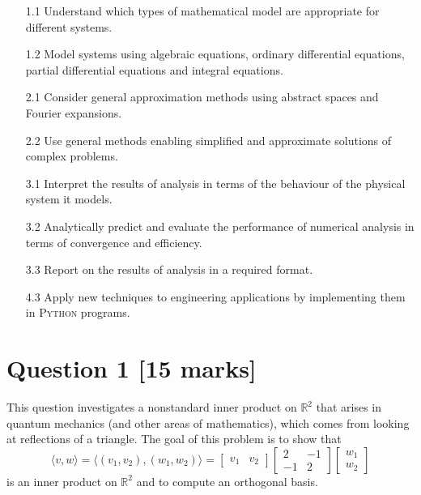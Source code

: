 \documentclass[12pt]{article}
\newcommand{\inp}[2]{\langle #1, #2 \rangle}
\newcommand{\RR}{\mathbb{R}}
\begin{document}
\begin{itemize}
    
    \item
    [1.1] Understand which types of mathematical model are appropriate for different systems.
    
    \item
    [1.2] Model systems using algebraic equations, ordinary differential equations, partial differential equations and integral equations.
    
    
    \item
    [2.1] Consider general approximation methods using abstract spaces and Fourier expansions.
    
    \item
    [2.2] Use general methods enabling simplified and approximate solutions of complex problems.
    
    \item
    [3.1] Interpret the results of analysis in terms of the behaviour of the physical system it models.
    
    \item
    [3.2] Analytically predict and evaluate the performance of numerical analysis in terms of convergence and efficiency.
    
    \item
    [3.3] Report on the results of analysis in a required format.
    
    \item
    [4.3] Apply new techniques to engineering applications by implementing them in \textsc{Python} programs.
    
\end{itemize}

\newpage

\clearpage
\setcounter{page}{2}

\section{\fontsize{14}{14}\selectfont Question 1 [15 marks]}

This question investigates a nonstandard inner product on $\RR^2$ that arises in quantum mechanics (and other areas of mathematics), which comes from looking at reflections of a triangle. The goal of this problem is to show that
\[
\inp{v}{w} = \inp{(v_1, v_2)}{(w_1,w_2)} =
\begin{bmatrix}
v_1 & v_2
\end{bmatrix}
\begin{bmatrix}
2 & -1 \\ -1 & 2
\end{bmatrix}
\begin{bmatrix}
w_1 \\ w_2
\end{bmatrix}
\]
is an inner product on $\RR^2$ and to compute an orthogonal basis.
\end{document}
